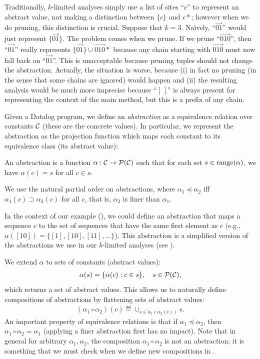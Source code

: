 Traditionally, $k$-limited analyses
simply use a list of sites ``$c$'' to represent an abstract value,
not making a distinction between $\{c\}$ and $c*$;
however when we do pruning, this distinction is crucial.
Suppose that $k=3$.
Na\"ively, ``$\vec{01}$'' would just represent $\{\vec{01}\}$.
The problem comes when we prune.
If we prune ``$\vec{010}$'', then ``$\vec{01}$'' really represents $\{\vec{01}\}\cup \vec{010}*$
because any chain starting with $\vec{010}$ must now fall back on ``$\vec{01}$''.
This is unacceptable because pruning tuples should not change the abstraction.
Actually, the situation is worse, because (i) in fact no pruning
(in the sense that some chains are ignored)
would happen and (ii) the resulting analysis would be much more imprecise because
``$[\,]$'' is always present for representing the context of the main method,
but this is a prefix of any chain.



Given a Datalog program, we define an {\em abstraction} as a equivalence relation over
constants $\mathcal{C}$ (these are the concrete values).  In particular, we represent the abstraction as the projection
function which maps each constant to its equivalence class (its abstract value):
\begin{definition}
\label{def:abstraction}
An abstraction is a function $\alpha : \mathcal{C} \to \mathcal{P}(\mathcal{C})$
such that for each set $s \in \text{\rm range}(\alpha)$,
we have $\alpha(c) = s$ for all $c \in s$.
\end{definition}
We use the natural partial order on abstractions,
where $\alpha_1 \preceq \alpha_2$ iff $\alpha_1(c) \supset \alpha_2(c)$ for all $c$,
that is, $\alpha_2$ is finer than $\alpha_1$.

In the context of our example (),
we could define an abstraction
that maps a sequence $c$ to the set of sequences that have the same first element as $c$
(e.g., $\alpha([10]) = \{ [1], [10], [11], \dots \}$).
This abstraction is a simplified version of the abstractions we use in our
$k$-limited analyses (see ).

We extend $\alpha$ to sets of constants (abstract values):
\begin{align}
\alpha(s) = \{ \alpha(c) : c \in s \}, \quad s \in \mathcal{P}(\mathcal{C}),
\end{align}
which returns a set of abstract values.
This allows us to naturally define compositions of abstractions
by flattening sets of abstract values:
\begin{align}
(\alpha_1 \circ \alpha_2)(c) \eqdef \cup_{s \in \alpha_1(\alpha_2(c))} s.
\end{align}
An important property of equivalence relations is
that if $\alpha_1 \preceq \alpha_2$, then $\alpha_1 \circ \alpha_2 = \alpha_1$
(applying a finer abstraction first has no impact).
Note that in general for arbitrary $\alpha_1,\alpha_2$,
the composition $\alpha_1 \circ \alpha_2$ is not an abstraction;
it is something that we must check when we define new compositions in
.

